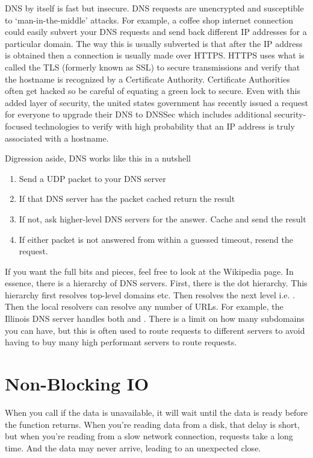 DNS by itself is fast but insecure.
DNS requests are unencrypted and susceptible to `man-in-the-middle' attacks.
For example, a coffee shop internet connection could easily subvert your DNS requests and send back different IP addresses for a particular domain.
The way this is usually subverted is that after the IP address is obtained then a connection is usually made over HTTPS.
HTTPS uses what is called the TLS (formerly known as SSL) to secure transmissions and verify that the hostname is recognized by a Certificate Authority.
Certificate Authorities often get hacked so be careful of equating a green lock to secure.
Even with this added layer of security, the united states government has recently issued a request for everyone to upgrade their DNS to DNSSec which includes additional security-focused technologies to verify with high probability that an IP address is truly associated with a hostname.

Digression aside, DNS works like this in a nutshell
\begin{enumerate}
\item Send a UDP packet to your DNS server
\item If that DNS server has the packet cached return the result
\item If not, ask higher-level DNS servers for the answer. Cache and send the result
  \item If either packet is not answered from within a guessed timeout, resend the request.
\end{enumerate}

If you want the full bits and pieces, feel free to look at the Wikipedia page.
In essence, there is a hierarchy of DNS servers.
First, there is the dot hierarchy.
This hierarchy first resolves top-level domains   etc.
Then resolves the next level i.e. .
Then the local resolvers can resolve any number of URLs.
For example, the Illinois DNS server handles both  and . There is a limit on how many subdomains you can have, but this is often used to route requests to different servers to avoid having to buy many high performant servers to route requests.

\section{ Non-Blocking IO}

When you call  if the data is unavailable, it will wait until the data is ready before the function returns.
When you're reading data from a disk, that delay is short, but when you're reading from a slow network connection, requests take a long time.
And the data may never arrive, leading to an unexpected close.

